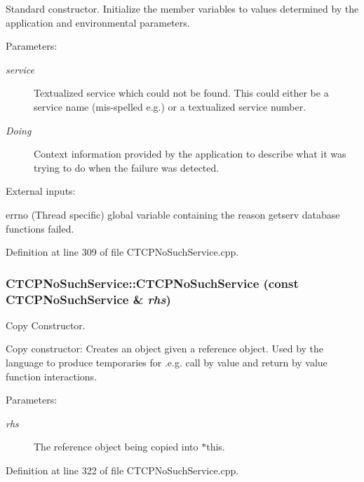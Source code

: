 Standard constructor. Initialize the member variables to values determined by the application and environmental parameters.\begin{Desc}
\item[Parameters: ]\par
\begin{description}
\item[{\em 
service}]Textualized service which could not be found. This could either be a service name (mis-spelled e.g.) or a textualized service number. \item[{\em 
Doing}]Context information provided by the application to describe what it was trying to do when the failure was detected.\end{description}
\end{Desc}
External inputs:\begin{CompactItemize}
\item 
errno (Thread specific) global variable containing the reason getserv database functions failed. \end{CompactItemize}


Definition at line 309 of file CTCPNo\-Such\-Service.cpp.
\subsubsection{\setlength{\rightskip}{0pt plus 5cm}CTCPNo\-Such\-Service::CTCPNo\-Such\-Service (const CTCPNo\-Such\-Service \& {\em rhs})}\label{classCTCPNoSuchService_a1}


Copy Constructor.

Copy constructor: Creates an object given a reference object. Used by the language to produce temporaries for .e.g. call by value and return by value function interactions.\begin{Desc}
\item[Parameters: ]\par
\begin{description}
\item[{\em 
rhs}]The reference object being copied into $\ast$this. \end{description}
\end{Desc}


Definition at line 322 of file CTCPNo\-Such\-Service.cpp.
